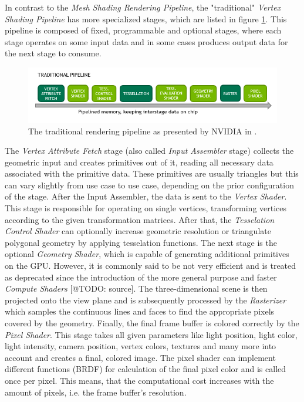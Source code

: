 In contrast to the \emph{Mesh Shading Rendering Pipeline}, the "traditional" \emph{Vertex Shading Pipeline} 
has more specialized stages, which are listed in figure \ref{fig:traditional-rendering-pipeline}. This pipeline 
is composed of fixed, programmable and optional stages, where each stage operates on some input data and in 
some cases produces output data for the next stage to consume.\\

\begin{figure}[h]
    \centering
    \includegraphics[width=\linewidth]{images/graphics/traditional-rendering-pipeline.png}
    \caption{The traditional rendering pipeline as presented by NVIDIA in \cite{Kubisch2018}.}
    \label{fig:traditional-rendering-pipeline}
\end{figure}

\noindent
The \emph{Vertex Attribute Fetch} stage (also called \emph{Input Assembler} stage) collects the geometric 
input and creates primitives out of it, reading all necessary data associated with the primitive data. 
These primitives are usually triangles but this can vary slightly from use case to use case, depending
on the prior configuration of the stage. After the Input Assembler, the data is sent to the \emph{Vertex Shader}.
This stage is responsible for operating on single vertices, transforming vertices according to the given 
transformation matrices. After that, the \emph{Tesselation Control Shader} can optionally increase geometric 
resolution or triangulate polygonal geometry by applying tesselation functions. The next stage is the optional 
\emph{Geometry Shader}, which is capable of generating additional primitives on the \ac{GPU}. However, it is 
commonly said to be not very efficient and is treated as deprecated since the introduction of the more general 
purpose and faster \emph{Compute Shaders} [@TODO: source]. The three-dimensional scene is then projected onto the 
view plane and is subsequently processed by the \emph{Rasterizer} which samples the continuous lines and faces to 
find the appropriate pixels covered by the geometry. Finally, the final frame buffer is colored correctly by the 
\emph{Pixel Shader}. This stage takes all given parameters like light position, light color, light intensity, camera 
position, vertex colors, textures and many more into account and creates a final, colored image. The pixel shader can 
implement different functions (\ac{BRDF}) for calculation of the final pixel color and is called once per pixel. 
This means, that the computational cost increases with the amount of pixels, i.e. the frame buffer's resolution. 

